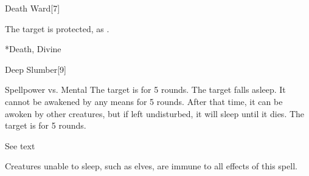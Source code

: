 \begin{spellsection}[Mass]{Death Ward}[7]
    \begin{spellheader}
    \end{spellheader}
    \begin{spellcontent}
        \begin{spelltargetinginfo}
        \end{spelltargetinginfo}
        \begin{spelleffects}
            \spelleffect The target is protected, as .
            \spelldur \durshort
        \end{spelleffects}
    \end{spellcontent}
    \begin{spellfooter}
        *{Death, Divine}
        \miscastexplode
    \end{spellfooter}
\end{spellsection}

\begin{spellsection}{Deep Slumber}[9]
    \begin{spellheader}
    \end{spellheader}
    \begin{spellcontent}
        \begin{spelltargetinginfo}
        \end{spelltargetinginfo}
        \begin{spelleffects}
            \begin{spellattack}{Spellpower vs. Mental}
                \spellsuccess The target is \blinded for 5 rounds.
                \spellcritical The target falls asleep. It cannot be awakened by any means for 5 rounds. After that time, it can be awoken by other creatures, but if left undisturbed, it will sleep until it dies.
                \spellfailure The target is \dazed for 5 rounds.
            \end{spellattack}
            \spelldur See text
        \end{spelleffects}
    \end{spellcontent}
    \begin{spellfooter}
        \spellnotes Creatures unable to sleep, such as elves, are immune to all effects of this spell.
        \miscastrandom
    \end{spellfooter}
\end{spellsection}

